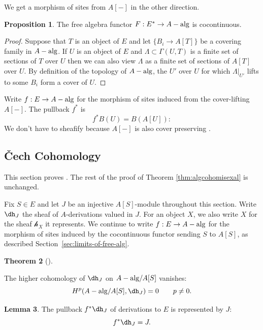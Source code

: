 \documentclass[11pt,reqno]{amsart}
\theoremstyle{definition}
\newtheorem{theorem}{Theorem}[section]
\newtheorem{lemma}[theorem]{Lemma}
\newtheorem{proposition}[theorem]{Proposition}
\newcommand{\dd}[1]{\dh_{#1}}
\newcommand{\hh}[1]{\mathcal{h}_{#1}}
\newcommand{\Aalg}{A-{\rm alg}}
\begin{document}
We get a morphism of sites from $A[-]$ in the other direction. 

\begin{proposition}
The free algebra functor $F : E^\ast \rightarrow \Aalg$ is cocontinuous. 
\end{proposition}
\begin{proof}
	Suppose that $T$ is an object of $E$ and let $\{ B_i \to A[T] \}$ be a covering family in $\Aalg$.  If $U$ is an object of $E$ and $\Lambda \subset \Gamma(U, T)$ is a finite set of sections of $T$ over $U$ then we can also view $\Lambda$ as a finite set of sections of $A[T]$ over $U$.  By definition of the topology of $\Aalg$, the $U'$ over $U$ for which $\Lambda \big|_{U'}$ lifts to some $B_i$ form a cover of $U$.
\end{proof}

Write $f : E \to \Aalg$ for the morphism of sites induced from the cover-lifting $A[-]$. The pullback $f^*$ is
\[f^* B(U) = B(A[U]):\]
We don't have to sheafify because $A[-]$ is also cover preserving \cite[00XR]{stacks-project}. 







\subsection{\v Cech Cohomology}


This section proves \cite[Corollary, pg. 190]{wisealgs1}. The rest of the proof of Theorem \ref{thm:algcohomisexal} is unchanged. 

Fix $S \in E$ and let $J$ be an injective $A[S]$-module throughout this section. Write $\dd{J}$ the sheaf of $A$-derivations valued in $J$. For an object $X$, we also write $X$ for the sheaf $\hh{X}$ it represents.  We continue to write $f : E \to \Aalg$ for the morphism of sites induced by the cocontinuous functor sending $S$ to $A[S]$, as described Section~\ref{sec:limits-of-free-alg}.


\begin{theorem}[{\cite[Corollary, pg. 190]{wisealgs1}}]\label{thm:injdervanishing}

The higher cohomology of $\dd{J}$ on $\Aalg/A[S]$ vanishes:
\[H^p(\Aalg/A[S], \dd{J}) = 0 \qquad p \neq 0.\]

\end{theorem}





\begin{lemma}
The pullback $f^*\dd{J}$ of derivations to $E$ is represented by $J$:
\[f^* \dd{J} = J.\]
\end{lemma}
\end{document}
